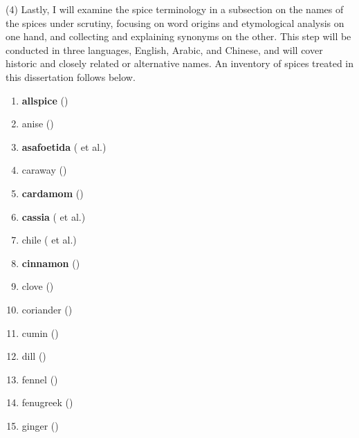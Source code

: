 (4) Lastly, I will examine the spice terminology in a subsection on the names of the spices under scrutiny, focusing on word origins and etymological analysis on one hand, and collecting and explaining synonyms on the other. This step will be conducted in three languages, English, Arabic, and Chinese, and will cover historic and closely related or alternative names. An inventory of spices treated in this dissertation follows below.

\clearpage

\begin{multicols}{2}
\begin{enumerate}
    \item \textbf{allspice} () \quad \hfill \pageref{sec:allspice}
    \item anise () %
    \item \textbf{asafoetida} ( et al.) \quad \hfill \pageref{sec:asafoetida}
    \item caraway () %
    \item \textbf{cardamom} () \quad \hfill \pageref{sec:cardamom}
    \item \textbf{cassia} ( et al.) \quad \hfill \pageref{sec:cassia}
    \item chile ( et al.) %
    \item \textbf{cinnamon} () \quad \hfill \pageref{sec:cinnamon}
    \item clove () %
    \item coriander () %
    \item cumin () %
    \item dill () %
    \item fennel () %
    \item fenugreek () %
    \item ginger () %

\end{enumerate}
\end{multicols}
